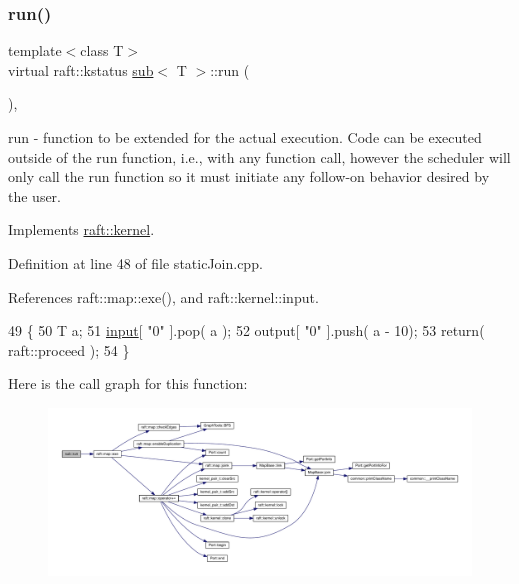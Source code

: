 \subsubsection{\texorpdfstring{run()}{run()}\hspace{0.1cm}{\footnotesize\ttfamily [4/12]}}
{\footnotesize\ttfamily template$<$class T$>$ \\
virtual raft\+::kstatus \hyperlink{classsub}{sub}$<$ T $>$\+::run (\begin{DoxyParamCaption}{ }\end{DoxyParamCaption})\hspace{0.3cm}{\ttfamily [inline]}, {\ttfamily [virtual]}}

run -\/ function to be extended for the actual execution. Code can be executed outside of the run function, i.\+e., with any function call, however the scheduler will only call the run function so it must initiate any follow-\/on behavior desired by the user. 

Implements \hyperlink{classraft_1_1kernel_a05094286d7577360fb1b91c91fc05901}{raft\+::kernel}.



Definition at line 48 of file static\+Join.\+cpp.



References raft\+::map\+::exe(), and raft\+::kernel\+::input.


\begin{DoxyCode}
49     \{
50         T a;
51         \hyperlink{classraft_1_1kernel_a6edbe35a56409d402e719b3ac36d6554}{input}[ \textcolor{stringliteral}{"0"} ].pop( a );
52         output[ \textcolor{stringliteral}{"0"} ].push( a - 10);
53         \textcolor{keywordflow}{return}( raft::proceed );
54     \}
\end{DoxyCode}
Here is the call graph for this function\+:
\nopagebreak
\begin{figure}[H]
\begin{center}
\leavevmode
\includegraphics[width=350pt]{classsub_a0a0c7461433ee8b5f4b24305282bf69a_cgraph}
\end{center}
\end{figure}
\hypertarget{classsub_a0a0c7461433ee8b5f4b24305282bf69a}{}\label{classsub_a0a0c7461433ee8b5f4b24305282bf69a} 
